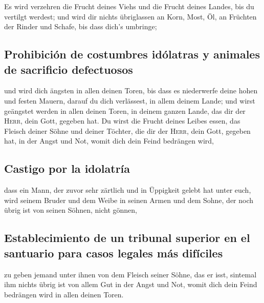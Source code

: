  Es wird verzehren die Frucht deines Viehs und die Frucht
deines Landes, bis du vertilgt werdest; und wird dir nichts übriglassen
an Korn, Most, Öl, an Früchten der Rinder und Schafe, bis dass dich's
umbringe;

\hypertarget{prohibiciuxf3n-de-costumbres-iduxf3latras-y-animales-de-sacrificio-defectuosos}{%
\subsection{Prohibición de costumbres idólatras y animales de sacrificio
defectuosos}\label{prohibiciuxf3n-de-costumbres-iduxf3latras-y-animales-de-sacrificio-defectuosos}}

 und wird dich ängsten in allen deinen Toren, bis dass es
niederwerfe deine hohen und festen Mauern, darauf du dich verlässest, in
allem deinem Lande; und wirst geängstet werden in allen deinen Toren, in
deinem ganzen Lande, das dir der \textsc{Herr}, dein Gott, gegeben hat.
 Du wirst die Frucht deines Leibes essen, das Fleisch
deiner Söhne und deiner Töchter, die dir der \textsc{Herr}, dein Gott,
gegeben hat, in der Angst und Not, womit dich dein Feind bedrängen wird,

\hypertarget{castigo-por-la-idolatruxeda}{%
\subsection{Castigo por la
idolatría}\label{castigo-por-la-idolatruxeda}}

 dass ein Mann, der zuvor sehr zärtlich und in Üppigkeit
gelebt hat unter euch, wird seinem Bruder und dem Weibe in seinen Armen
und dem Sohne, der noch übrig ist von seinen Söhnen, nicht gönnen,

\hypertarget{establecimiento-de-un-tribunal-superior-en-el-santuario-para-casos-legales-muxe1s-difuxedciles}{%
\subsection{Establecimiento de un tribunal superior en el santuario para
casos legales más
difíciles}\label{establecimiento-de-un-tribunal-superior-en-el-santuario-para-casos-legales-muxe1s-difuxedciles}}

 zu geben jemand unter ihnen von dem Fleisch seiner
Söhne, das er isst, sintemal ihm nichts übrig ist von allem Gut in der
Angst und Not, womit dich dein Feind bedrängen wird in allen deinen
Toren.

